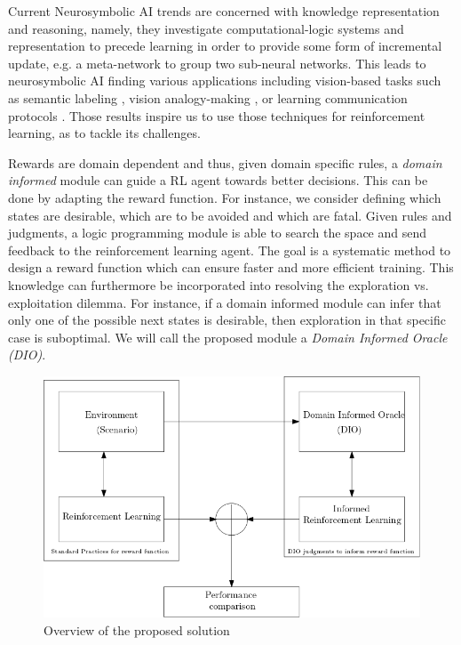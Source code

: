 \documentclass[a4paper,11pt]{article}
\theoremstyle{definition}
\begin{document}
Current Neurosymbolic AI trends are concerned with knowledge representation and reasoning, namely, they investigate computational-logic systems 
and representation to precede learning in order to provide some form of incremental update, e.g. a meta-network to group two sub-neural networks. \cite{Besold2017NeuralSymbolicLA}
This leads to neurosymbolic AI finding various applications including vision-based tasks such as semantic labeling \cite{vinyals2015, karpathy2015}, 
vision analogy-making \cite{Reed2015DeepVA}, or learning communication protocols \cite{Foerster2016LearningTC}. Those results inspire us to use those techniques for reinforcement learning, as to tackle its challenges.

\medskip
Rewards are domain dependent and thus, given domain specific rules, a \emph{domain informed} module can guide a RL agent towards better decisions. This can be done by 
adapting the reward function. For instance, we consider defining which states are desirable, which are to be avoided and which are fatal. Given rules and judgments, a logic programming module 
is able to search the space and send feedback to the reinforcement learning agent. The goal is a systematic method to design a reward function which can ensure faster and more efficient 
training. This knowledge can furthermore be incorporated into resolving the exploration vs. exploitation dilemma. For instance, if a domain informed module 
can infer that only one of the possible next states is desirable, then exploration in that specific case is suboptimal.  
We will call the proposed module a \emph{Domain Informed Oracle (DIO)}. 

\begin{figure}[H]
  \centering
  \includegraphics[scale=0.5]{overview.png}
  \caption{Overview of the proposed solution}
  \label{fig:overview}
\end{figure}
\end{document}
